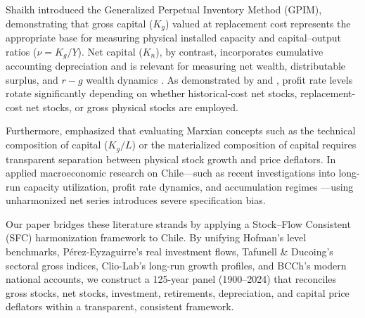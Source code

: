 Shaikh introduced the Generalized Perpetual Inventory Method (GPIM), demonstrating that gross capital ($K_g$) valued at replacement cost represents the appropriate base for measuring physical installed capacity and capital--output ratios ($\nu = K_g / Y$). Net capital ($K_n$), by contrast, incorporates cumulative accounting depreciation and is relevant for measuring net wealth, distributable surplus, and $r - g$ wealth dynamics \citep{Piketty2014}. As demonstrated by \citet{Basu2013} and \citet{Marquetti2010}, profit rate levels rotate significantly depending on whether historical-cost net stocks, replacement-cost net stocks, or gross physical stocks are employed.

Furthermore, \citet{Zarembka2015, Zarembka2019} emphasized that evaluating Marxian concepts such as the technical composition of capital ($K_g / L$) or the materialized composition of capital requires transparent separation between physical stock growth and price deflators. In applied macroeconomic research on Chile—such as recent investigations into long-run capacity utilization, profit rate dynamics, and accumulation regimes \citep{Duran2022, Polanco2019}—using unharmonized net series introduces severe specification bias.

Our paper bridges these literature strands by applying a Stock--Flow Consistent (SFC) harmonization framework to Chile. By unifying Hofman's level benchmarks, Pérez-Eyzaguirre's real investment flows, Tafunell \& Ducoing's sectoral gross indices, Clio-Lab's long-run growth profiles, and BCCh's modern national accounts, we construct a 125-year panel (1900--2024) that reconciles gross stocks, net stocks, investment, retirements, depreciation, and capital price deflators within a transparent, consistent framework.
